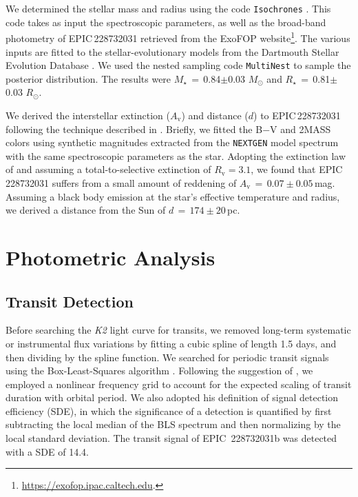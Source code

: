 \documentclass[twocolumn]{aastex61}
\begin{document}
We determined the stellar mass and radius using the code {\tt Isochrones} \citep{Morton2015}. This code takes as input the spectroscopic parameters, as well as the broad-band photometry of EPIC\,228732031 retrieved from the ExoFOP website\footnote{\url{https://exofop.ipac.caltech.edu}.}. The various inputs are fitted to the stellar-evolutionary models from the Dartmouth Stellar Evolution Database \citep{Dotter2008}. We used the nested sampling code {\tt MultiNest} \citep{Feroz2009} to sample the posterior distribution. The results were $M_{\star}\,=\,$0.84$\pm$0.03 $M_{\odot}$ and $R_{\star}\,=\,$0.81$\pm$0.03 $R_{\odot}$.

We derived the interstellar extinction ($A_\mathrm{v}$) and distance ($d$) to EPIC\,228732031 following the technique described in \citet{Gandolfi2008}. Briefly, we fitted the B$-$V and 2MASS colors using synthetic magnitudes extracted from the \texttt{NEXTGEN} model spectrum \citep{Hauschildt1999} with the same spectroscopic parameters as the star. Adopting the extinction law of \citet{Cardelli1989} and assuming a total-to-selective extinction of $R_\mathrm{v}=3.1$, we found that EPIC\,228732031 suffers from a small amount of reddening of $A_\mathrm{v}\,=\,0.07\pm0.05$\,mag. Assuming a black body emission at the star's effective temperature and radius,
we derived a distance from the Sun of $d\,=\,174\pm20$\,pc.


\section{Photometric Analysis}
\label{sec:photometric}

\subsection{Transit Detection}\label{transit_detection}

Before searching the {\it K2} light curve for transits, we removed long-term systematic or instrumental flux variations by fitting a cubic spline of length 1.5 days, and then dividing by the spline function.
We searched for periodic transit signals using the Box-Least-Squares algorithm \citep[BLS,][]{Kovac2002}.
Following the suggestion of \citet{Ofir2014}, we employed a nonlinear frequency grid to account for
the expected scaling of transit duration with orbital period. We also adopted his definition of signal detection efficiency (SDE), in which the significance of a detection is quantified by first subtracting the local median of the BLS spectrum and then normalizing by the local standard deviation. The transit signal of EPIC~228732031b was detected with a SDE of 14.4.
\end{document}
